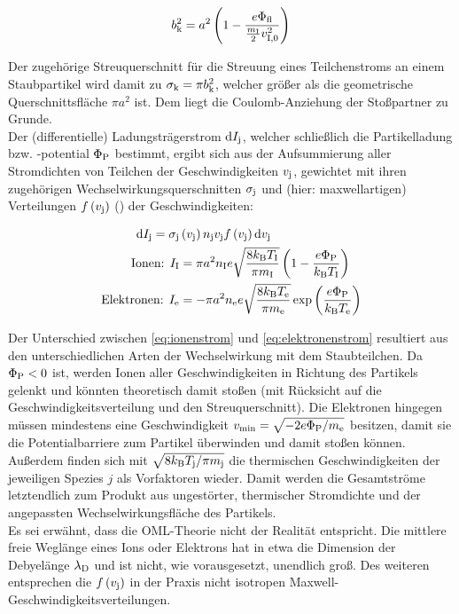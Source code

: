       \begin{align}
        b_\text{k}^2=a^2\left(1-\frac{e\Phi_\text{fl}}{\frac{m_\text{I}}{2}v_\text{I,0}^2}\right) \label{eq:krit}
      \end{align}

    Der zugehörige Streuquerschnitt für die Streuung eines Teilchenstroms an einem Staubpartikel wird damit zu $\sigma_\text{k}=\pi b_\text{k}^2$, welcher größer als die geometrische Querschnittsfläche $\pi a^2$ ist. Dem liegt die Coulomb-Anziehung der Stoßpartner zu Grunde.\\
    Der (differentielle) Ladungsträgerstrom $\textnormal{d} I_\text{j}$, welcher schließlich die Partikelladung bzw. -potential $\Phi_\text{P}$ bestimmt, ergibt sich aus der Aufsummierung aller Stromdichten von Teilchen der Geschwindigkeiten $v_\text{j}$, gewichtet mit ihren zugehörigen Wechselwirkungsquerschnitten $\sigma_\text{j}$ und (hier: maxwellartigen) Verteilungen $f\left(v_\text{j}\right)$ (\cite{Melzer12}) der Geschwindigkeiten:

      \begin{align}
        \textnormal{d} I_\text{j}=\sigma_\text{j}&\left(v_\text{j}\right)n_\text{j}v_\text{j}f\left(v_\text{j}\right)\textnormal{d} v_\text{j} \nonumber \\
        \text{Ionen: } I_\text{I}&=\pi a^2n_\text{I}e\sqrt{\frac{8k_\text{B}T_\text{I}}{\pi m_\text{I}}}\left(1-\frac{e\Phi_\text{P}}{k_\text{B}T_\text{I}}\right) \label{eq:ionenstrom} \\
        \text{Elektronen: } I_\text{e}&=-\pi a^2n_\text{e}e\sqrt{\frac{8k_\text{B}T_\text{e}}{\pi m_\text{e}}}\exp\left(\frac{e\Phi_\text{P}}{k_\text{B}T_\text{e}}\right) \label{eq:elektronenstrom}
      \end{align}

    Der Unterschied zwischen \autoref{eq:ionenstrom} und \autoref{eq:elektronenstrom} resultiert aus den unterschiedlichen Arten der Wechselwirkung mit dem Staubteilchen. Da $\Phi_\text{P}<0$ ist, werden Ionen aller Geschwindigkeiten in Richtung des Partikels gelenkt und könnten theoretisch damit stoßen (mit Rücksicht auf die Geschwindigkeitsverteilung und den Streuquerschnitt). Die Elektronen hingegen müssen mindestens eine Geschwindigkeit $v_\text{min}=\sqrt{-2e\Phi_\text{P}/m_\text{e}}$ besitzen, damit sie die Potentialbarriere zum Partikel überwinden und damit stoßen können. Au{\ss}erdem finden sich mit $\sqrt{8k_\text{B}T_\text{j}/\pi m_\text{j}}$ die thermischen Geschwindigkeiten der jeweiligen Spezies $j$ als Vorfaktoren wieder. Damit werden die Gesamtstr\"ome letztendlich zum Produkt aus ungest\"orter, thermischer Stromdichte und der angepassten Wechselwirkungsfl\"ache des Partikels. \\
    Es sei erwähnt, dass die OML-Theorie nicht der Realität entspricht. Die mittlere freie Weglänge eines Ions oder Elektrons hat in etwa die Dimension der Debyelänge $\lambda_\text{D}$ und ist nicht, wie vorausgesetzt, unendlich groß. Des weiteren entsprechen die $f\left(v_\text{j}\right)$ in der Praxis nicht isotropen Maxwell-Geschwindigkeitsverteilungen.

